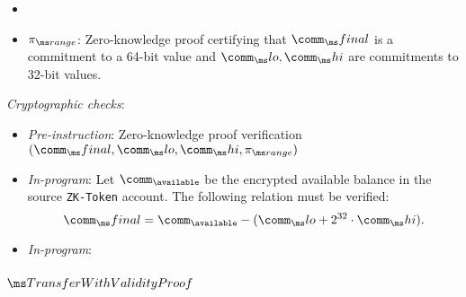 {\begin{itemize}
  \item {}

  \item $\pirange$: Zero-knowledge proof certifying that $\comm_\final$ is a
    commitment to a 64-bit value and $\comm_\lo, \comm_\hi$ are commitments to
    32-bit values.

\end{itemize}

\noindent
\textit{Cryptographic checks}:
\begin{itemize}
  \item \textit{Pre-instruction}: Zero-knowledge proof verification
    $(\comm_\final, \comm_\lo, \comm_\hi, \pirange)$
  \item \textit{In-program}: Let $\comm_\available$ be the encrypted available
    balance in the source \texttt{ZK-Token} account. The following relation must
    be verified:
    \[ \comm_\final = \comm_\available - (\comm_\lo + 2^{32} \cdot \comm_\hi) .\]
  \item \textit{In-program}: 
\end{itemize}

}

\newpage
\subsubsection{$\TransferWithValidityProof$}

